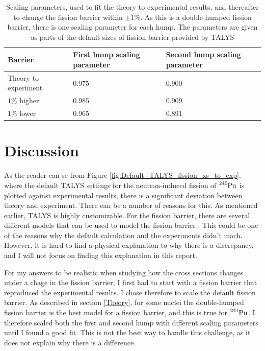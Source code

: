 \documentclass[]{article}
\begin{document}
\begin{table} [H]
	\centering
	\caption{Scaling parameters, used to fit the theory to experimental results, and thereafter to change the fission barrier within $\pm 1 \%$. As this is a double-humped fission barrier, there is one scaling parameter for each hump. The parameters are given as parts of the default sizes of fission barrier provided by TALYS}
	\begin{tabularx}{\textwidth}{XXX} \hline
		\label{tab:scalingparm_fission_barrier}
		Barrier & First hump scaling parameter & Second hump scaling parameter\\ \hline
		Theory to experiment & 0.975 & 0.900 \\
		$1 \% $ higher & 0.985  & 0.909  \\
		$1 \% $ lower & 0.965 & 0.891 \\ \hline
	\end{tabularx}
\end{table}

\section{Discussion}

As the reader can se from Figure \ref{fig:Default_TALYS_fission_xs_to_exp}, where the default TALYS settings for the neutron-induced fission of $\ce{^{240}Pu}$ is plotted against experimental results, there is a significant deviation between theory and experiment. There can be a number of reasons for this. As mentioned earlier, TALYS is highly customizable. For the fission barrier, there are several different models that can be used to model the fission barrier \cite{TALYSmanual}. This could be one of the reasons why the default calculation and the experiments didn't mach. However, it is hard to find a physical explanation to why there is a discrepancy, and I will not focus on finding this explanation in this report. 

\par 
\vspace{3mm}

 \noindent For my answers to be realistic when studying how the cross sections changes under a chage in the fission barrier, I first had to start with a fission barrier that reproduced the experimental results. I chose therefore to scale the default fission barrier. As described in section \ref{Theory}, for some nuclei the double-humped fission barrier is the best model for a fission barrier, and this is true for $\ce{^{241}Pu}$. I therefore scaled both the first and second hump with different scaling parameters until I found a good fit. This is not the best way to handle this challenge, as it does not explain why there is a difference.
 
\end{document}
